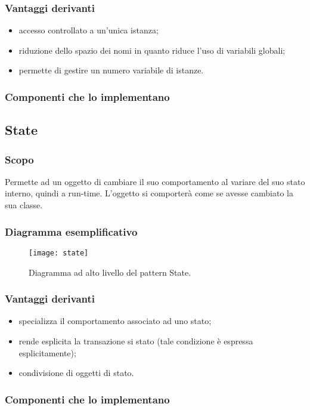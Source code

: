 \subsubsection{Vantaggi derivanti}
\begin{itemize}
\item accesso controllato a un'unica istanza;
\item riduzione dello spazio dei nomi in quanto riduce l'uso di variabili globali;
\item permette di gestire un numero variabile di istanze.
\end{itemize}

\subsubsection{Componenti che lo implementano}

\subsection{State}
\subsubsection{Scopo}
Permette ad un oggetto di cambiare il suo comportamento al variare del suo stato interno, quindi a run-time. L'oggetto si comporterà come se avesse cambiato la sua classe.
\subsubsection{Diagramma esemplificativo}
\begin{figure}[h]
\centering
\texttt{[image: state]}
\caption{Diagramma ad alto livello del pattern State.}\label{fig:state}
\end{figure}
\subsubsection{Vantaggi derivanti}
\begin{itemize}
\item specializza il comportamento associato ad uno stato;
\item rende esplicita la transazione si stato (tale condizione è espressa esplicitamente);
\item condivisione di oggetti di stato.
\end{itemize}

\subsubsection{Componenti che lo implementano}

